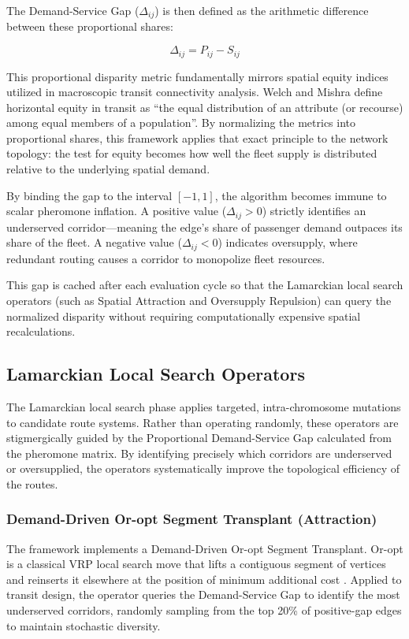 {{The Demand-Service Gap ($\Delta_{ij}$) is then defined as the arithmetic difference between these proportional shares:

\[
\Delta_{ij} = P_{ij} - S_{ij}
\]

This proportional disparity metric fundamentally mirrors spatial equity indices utilized in macroscopic transit connectivity analysis. Welch and Mishra \citeyearpar{welch2013measure} define horizontal equity in transit as ``the equal distribution of an attribute (or recourse) among equal members of a population''. By normalizing the metrics into proportional shares, this framework applies that exact principle to the network topology: the test for equity becomes how well the fleet supply is distributed relative to the underlying spatial demand. 

By binding the gap to the interval $[-1, 1]$, the algorithm becomes immune to scalar pheromone inflation. A positive value ($\Delta_{ij} > 0$) strictly identifies an underserved corridor—meaning the edge's share of passenger demand outpaces its share of the fleet. A negative value ($\Delta_{ij} < 0$) indicates oversupply, where redundant routing causes a corridor to monopolize fleet resources. 

This gap is cached after each evaluation cycle so that the Lamarckian local search operators (such as Spatial Attraction and Oversupply Repulsion) can query the normalized disparity without requiring computationally expensive spatial recalculations.

\subsection{Lamarckian Local Search Operators}
\label{sec:local_search}
\noindent The Lamarckian local search phase applies targeted, intra-chromosome mutations to candidate route systems. Rather than operating randomly, these operators are stigmergically guided by the Proportional Demand-Service Gap calculated from the pheromone matrix. By identifying precisely which corridors are underserved or oversupplied, the operators systematically improve the topological efficiency of the routes. 

\subsubsection{Demand-Driven Or-opt Segment Transplant (Attraction)}
\label{sec:or_opt_attraction}
\noindent The framework implements a Demand-Driven Or-opt Segment Transplant. Or-opt is a classical \ac{VRP} local search move that lifts a contiguous segment of vertices and reinserts it elsewhere at the position of minimum additional cost \citep{laporte2002classical}. Applied to transit design, the operator queries the Demand-Service Gap to identify the most underserved corridors, randomly sampling from the top 20\% of positive-gap edges to maintain stochastic diversity. 

}}
